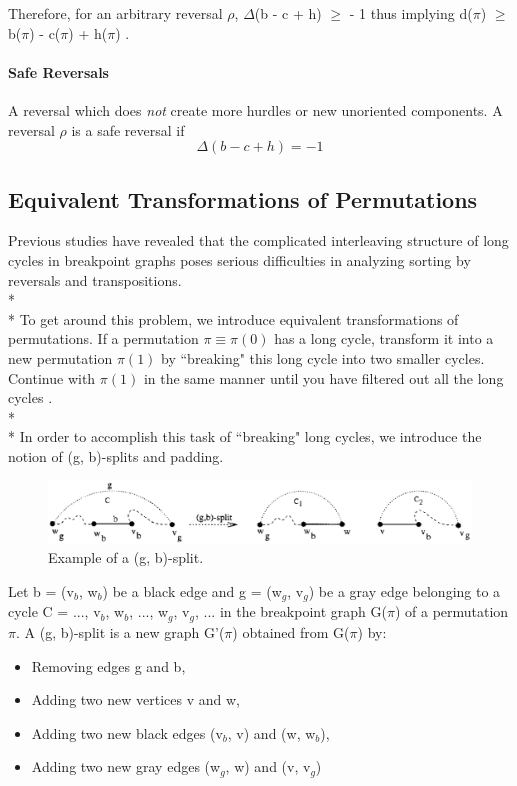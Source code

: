 \documentclass[10pt]{article}
\begin{document}
Therefore, for an arbitrary reversal $\rho$, $\Delta$(b - c + h) $\geq$ - 1
thus implying d($\pi$) $\geq$ b($\pi$) - c($\pi$) + h($\pi$) \cite{Hannenhalli95transformingcabbage}.

\paragraph{Safe Reversals} A reversal which does \emph{not} create more hurdles
or new unoriented components. A reversal $\rho$ is a safe reversal if
$$\Delta(b - c + h) = -1$$

\subsection*{Equivalent Transformations of Permutations}
Previous studies have revealed that the complicated interleaving structure of
long cycles in breakpoint graphs poses serious difficulties in analyzing
sorting by reversals and transpositions.
\\*
\\*
To get around this problem, we introduce equivalent transformations of
permutations. If a permutation $\pi \equiv \pi(0)$ has a long cycle, transform
it into a new permutation $\pi(1)$ by ``breaking" this long cycle into two
smaller cycles. Continue with $\pi(1)$ in the same manner until you have
filtered out all the long cycles \cite{Hannenhalli95transformingcabbage}.
\\*
\\*
In order to accomplish this task of ``breaking" long cycles, we introduce the
notion of (g, b)-splits and padding.

\begin{figure}[here]
\includegraphics[scale=0.4]{resources/splits.eps}
\caption{Example of a (g, b)-split.}
\label{fig:splits}
\end{figure}

Let b = (v$_{b}$, w$_{b}$) be a black edge and g = (w$_{g}$, v$_{g}$) be a gray
edge belonging to a cycle C = ..., v$_{b}$, w$_{b}$, ..., w$_{g}$, v$_{g}$, ...
in the breakpoint graph G($\pi$) of a permutation $\pi$. A (g, b)-split is a
new graph G'($\pi$) obtained from G($\pi$) by:

\begin{itemize}
    \item Removing edges g and b,
    \item Adding two new vertices v and w,
    \item Adding two new black edges (v$_{b}$, v) and (w, w$_{b}$),
    \item Adding two new gray edges (w$_{g}$, w) and (v, v$_{g}$)
    \cite{Hannenhalli95transformingcabbage}
\end{itemize}
\end{document}
